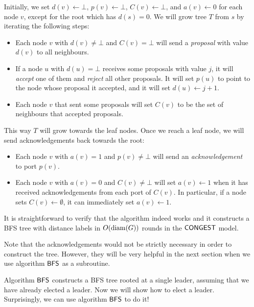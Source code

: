 Initially, we set $d(v) \gets \bot$, $p(v) \gets \bot$, $C(v) \gets \bot$, and $a(v) \gets 0$ for each node $v$, except for the root which has $d(s) = 0$. We will grow tree $T$ from $s$ by iterating the following steps:
\begin{itemize}
    \item Each node $v$ with $d(v) \ne \bot$ and $C(v) = \bot$ will send a \emph{proposal} with value $d(v)$ to all neighbours.
    \item If a node $u$ with $d(u) = \bot$ receives some proposals with value $j$, it will \emph{accept} one of them and \emph{reject} all other proposals. It will set $p(u)$ to point to the node whose proposal it accepted, and it will set $d(u) \gets j+1$.
    \item Each node $v$ that sent some proposals will set $C(v)$ to be the set of neighbours that accepted proposals.
\end{itemize}
This way $T$ will grow towards the leaf nodes. Once we reach a leaf node, we will send acknowledgements back towards the root:
\begin{itemize}
    \item Each node $v$ with $a(v) = 1$ and $p(v) \ne \bot$ will send an \emph{acknowledgement} to port $p(v)$.
    \item Each node $v$ with $a(v) = 0$ and $C(v) \ne \bot$ will set $a(v) \gets 1$ when it has received acknowledgements from each port of $C(v)$. In particular, if a node sets $C(v) \gets \emptyset$, it can immediately set $a(v) \gets 1$.
\end{itemize}
It is straightforward to verify that the algorithm indeed works and it constructs a BFS tree with distance labels in $O(\operatorname{diam}(G))$ rounds in the $\textup{\sffamily CONGEST}$ model.

Note that the acknowledgements would not be strictly necessary in order to construct the tree. However, they will be very helpful in the next section when we use algorithm $\textup{\sffamily BFS}$ as a subroutine.


\label{sec:leader}

Algorithm $\textup{\sffamily BFS}$ constructs a BFS tree rooted at a single leader, assuming that we have already elected a leader. Now we will show how to elect a leader. Surprisingly, we can use algorithm $\textup{\sffamily BFS}$ to do it!

